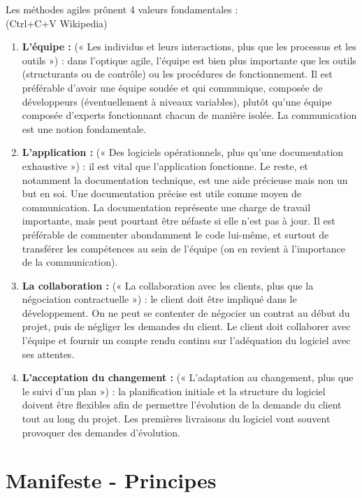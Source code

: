 \documentclass{report}
\begin{document}
		Les méthodes agiles prônent 4 valeurs fondamentales : \\
		(Ctrl+C+V Wikipedia)\\

		\begin{enumerate}
			\item \textbf{L'équipe :} (« Les individus et leurs interactions, plus que les processus et les outils ») : dans l'optique agile, l'équipe est bien plus importante que les outils (structurants ou de contrôle) ou les procédures de fonctionnement. Il est préférable d'avoir une équipe soudée et qui communique, composée de développeurs (éventuellement à niveaux variables), plutôt qu'une équipe composée d'experts fonctionnant chacun de manière isolée. La communication est une notion fondamentale.
			\item \textbf{L'application :} (« Des logiciels opérationnels, plus qu'une documentation exhaustive ») : il est vital que l'application fonctionne. Le reste, et notamment la documentation technique, est une aide précieuse mais non un but en soi. Une documentation précise est utile comme moyen de communication. La documentation représente une charge de travail importante, mais peut pourtant être néfaste si elle n'est pas à jour. Il est préférable de commenter abondamment le code lui-même, et surtout de transférer les compétences au sein de l'équipe (on en revient à l'importance de la communication).
			\item \textbf{La collaboration :} (« La collaboration avec les clients, plus que la négociation contractuelle ») : le client doit être impliqué dans le développement. On ne peut se contenter de négocier un contrat au début du projet, puis de négliger les demandes du client. Le client doit collaborer avec l'équipe et fournir un compte rendu continu sur l'adéquation du logiciel avec ses attentes.
			\item \textbf{L'acceptation du changement :} (« L'adaptation au changement, plus que le suivi d'un plan ») : la planification initiale et la structure du logiciel doivent être flexibles afin de permettre l'évolution de la demande du client tout au long du projet. Les premières livraisons du logiciel vont souvent provoquer des demandes d'évolution.
		\end{enumerate}

	\section{Manifeste - Principes}
\end{document}
